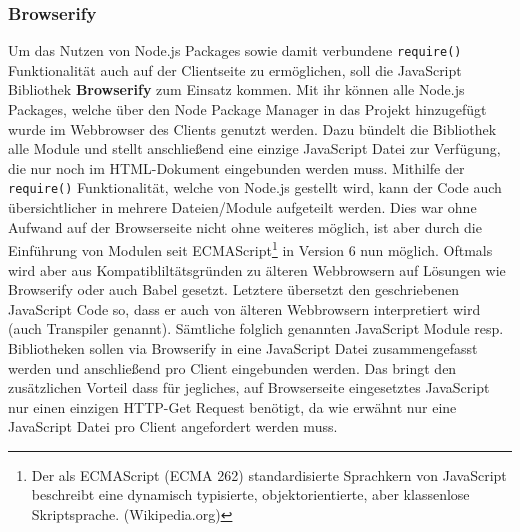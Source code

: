 \subsubsection{Browserify}\label{sec:browserify}
Um das Nutzen von Node.js Packages sowie damit verbundene \texttt{require()} Funktionalität auch auf der Clientseite zu ermöglichen, soll die JavaScript Bibliothek \textbf{Browserify} zum Einsatz kommen. Mit ihr können alle Node.js Packages, welche über den Node Package Manager in das Projekt hinzugefügt wurde im Webbrowser des Clients genutzt werden. Dazu bündelt die Bibliothek alle Module und stellt anschließend eine einzige JavaScript Datei zur Verfügung, die nur noch im HTML-Dokument eingebunden werden muss. Mithilfe der \texttt{require()} Funktionalität, welche von Node.js gestellt wird, kann der Code auch übersichtlicher in mehrere Dateien/Module aufgeteilt werden. Dies war ohne Aufwand auf der Browserseite nicht ohne weiteres möglich, ist aber durch die Einführung von Modulen seit ECMAScript\footnote{Der als ECMAScript (ECMA 262) standardisierte Sprachkern von JavaScript beschreibt eine dynamisch typisierte, objektorientierte, aber klassenlose Skriptsprache. (Wikipedia.org)} in Version 6  nun möglich. Oftmals wird aber aus Kompatibliltätsgründen  zu älteren Webbrowsern auf Lösungen wie Browserify oder auch Babel gesetzt. Letztere übersetzt den geschriebenen JavaScript Code so, dass er auch von älteren Webbrowsern interpretiert wird (auch Transpiler genannt). Sämtliche folglich genannten JavaScript Module resp. Bibliotheken sollen via Browserify in eine JavaScript Datei zusammengefasst werden und anschließend pro Client eingebunden werden. Das bringt den zusätzlichen Vorteil dass für jegliches, auf Browserseite eingesetztes JavaScript nur einen einzigen HTTP-Get Request benötigt, da wie erwähnt nur eine JavaScript Datei pro Client angefordert werden muss. 
